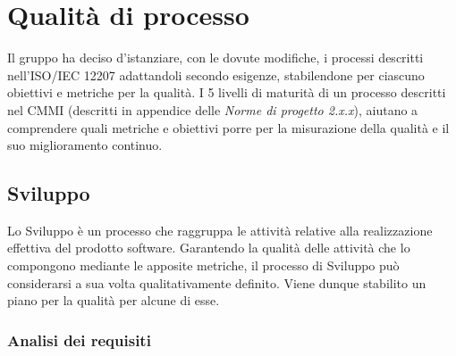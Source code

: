 \section{Qualità di processo}
Il gruppo ha deciso d'istanziare, con le dovute modifiche, i processi descritti
nell'ISO/IEC 12207 adattandoli secondo esigenze, stabilendone per ciascuno
obiettivi e metriche per la qualità.
I 5 livelli di maturità di un processo descritti nel CMMI
(descritti in appendice delle \textit{Norme di progetto 2.x.x}\doc),
aiutano a comprendere quali metriche e obiettivi porre per la misurazione della
qualità e il suo miglioramento continuo.
\subsection{Sviluppo}
Lo Sviluppo è un processo che raggruppa le attività relative alla realizzazione
effettiva del prodotto software. Garantendo la qualità delle attività che lo
compongono mediante le apposite metriche, il processo di Sviluppo può
considerarsi a sua volta qualitativamente definito. Viene dunque stabilito un piano per la qualità per alcune di esse.

\subsubsection{Analisi dei requisiti}
